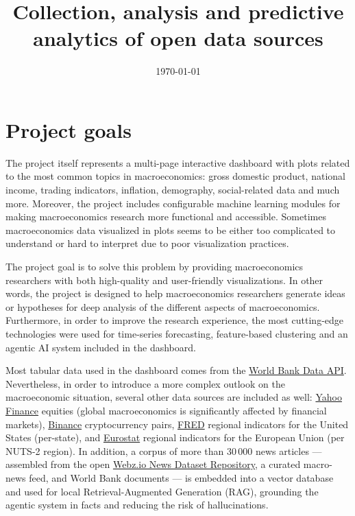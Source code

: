\documentclass[a4paper,12pt]{article}
\title{Collection, analysis and predictive analytics of open data sources}
\author{}
\date{\today{}}
\begin{document}
\maketitle{}

\section{Project goals}
The project itself represents a multi-page interactive dashboard with plots related to the most common topics in macroeconomics: gross domestic product, national income, trading indicators, inflation, demography, social-related data and much more.
Moreover, the project includes configurable machine learning modules for making macroeconomics research more functional and accessible.
Sometimes macroeconomics data visualized in plots seems to be either too complicated to understand or hard to interpret due to poor visualization practices.

The project goal is to solve this problem by providing macroeconomics researchers with both high-quality and user-friendly visualizations.
In other words, the project is designed to help macroeconomics researchers generate ideas or hypotheses for deep analysis of the different aspects of macroeconomics.
Furthermore, in order to improve the research experience, the most cutting-edge technologies were used for time-series forecasting, feature-based clustering and an agentic AI system included in the dashboard.

Most tabular data used in the dashboard comes from the \href{https://data360.worldbank.org/en/search}{World Bank Data API}. Nevertheless, in order to introduce a more complex outlook on the macroeconomic situation, several other data sources are included as well:
\href{https://finance.yahoo.com/}{Yahoo Finance} equities (global macroeconomics is significantly affected by financial markets),
\href{https://www.binance.com/}{Binance} cryptocurrency pairs,
\href{https://fred.stlouisfed.org/}{FRED} regional indicators for the United States (per-state),
and \href{https://ec.europa.eu/eurostat}{Eurostat} regional indicators for the European Union (per NUTS-2 region).
In addition, a corpus of more than 30\,000 news articles --- assembled from the open \href{https://github.com/Webhose/free-news-datasets}{Webz.io News Dataset Repository}, a curated macro-news feed, and World Bank documents --- is embedded into a vector database and used for local Retrieval-Augmented Generation (RAG), grounding the agentic system in facts and reducing the risk of hallucinations.
\end{document}
